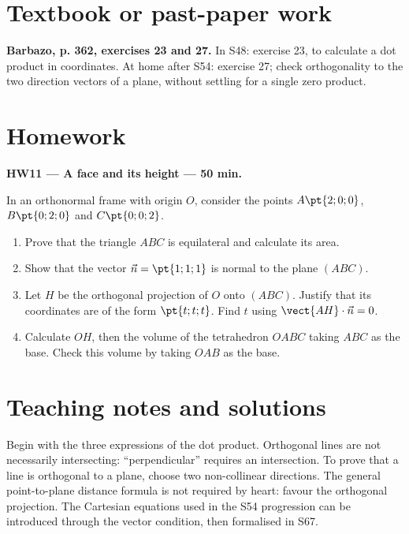 \section{Textbook or past-paper work}\textbf{Barbazo, p. 362, exercises 23 and 27.} In S48: exercise 23, to calculate a dot product in coordinates. At home after S54: exercise 27; check orthogonality to the two direction vectors of a plane, without settling for a single zero product.

\mxnewpage
\section{Homework}\textbf{HW11 --- A face and its height --- 50 min.}\par In an orthonormal frame with origin $O$, consider the points $A\pt{2;0;0}$, $B\pt{0;2;0}$ and $C\pt{0;0;2}$.
\begin{enumerate}\item Prove that the triangle $ABC$ is equilateral and calculate its area.
\item Show that the vector $\vec n=\pt{1;1;1}$ is normal to the plane $(ABC)$.
\item Let $H$ be the orthogonal projection of $O$ onto $(ABC)$. Justify that its coordinates are of the form $\pt{t;t;t}$. Find $t$ using $\vect{AH}\cdot\vec n=0$.
\item Calculate $OH$, then the volume of the tetrahedron $OABC$ taking $ABC$ as the base. Check this volume by taking $OAB$ as the base.\end{enumerate}

\ifmxteacher\mxnewpage\section{Teaching notes and solutions}\begin{teachernote}Begin with the three expressions of the dot product. Orthogonal lines are not necessarily intersecting: ``perpendicular'' requires an intersection. To prove that a line is orthogonal to a plane, choose two non-collinear directions. The general point-to-plane distance formula is not required by heart: favour the orthogonal projection. The Cartesian equations used in the S54 progression can be introduced through the vector condition, then formalised in S67.\end{teachernote}

